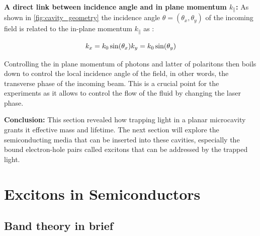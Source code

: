 \bigskip\noindent

\noindent\textbf{A direct link between incidence angle and in plane momentum $k_{\parallel}$:}
As shown in \autoref{fig:cavity_geometry} the incidence angle $\theta= (\theta_x, \theta_y)$ of the incoming field is related to the in-plane momentum $k_{\parallel}$ as :

\begin{equation}
    k_{x} = k_0 \sin(\theta_x) \\
    k_{y} = k_0 \sin(\theta_y)
    \label{eq:kpar}
\end{equation}

Controlling the in plane momentum of photons and latter of polaritons then boils down to control the local incidence angle of the field, in other words, the transverse phase of the incoming beam. This is a crucial point for the experiments as it allows to control the flow of the fluid by changing the laser phase.

\bigskip\noindent
\textbf{Conclusion:}
This section revealed how trapping light in a planar microcavity grants it effective mass and lifetime. The next section will explore the semiconducting media that can be inserted into these cavities, especially the bound electron-hole pairs called excitons that can be addressed by the trapped light.


\section{Excitons in Semiconductors}

\subsection{Band theory in brief}

